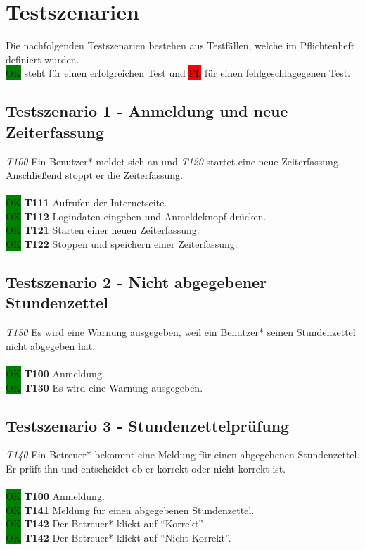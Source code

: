 \section{Testszenarien}
Die nachfolgenden Testszenarien bestehen aus Testfällen, welche im Pflichtenheft \linebreak definiert wurden. \\
\colorbox{green}{OK} steht für einen erfolgreichen Test und \colorbox{red}{FL} für einen fehlgeschlagegenen Test.


\subsection{Testszenario 1 - Anmeldung und neue Zeiterfassung}
\emph{T100} Ein Benutzer* meldet sich an und \emph{T120} startet eine neue Zeiterfassung. Anschließend stoppt er die Zeiterfassung.
\\\\
\colorbox{green}{OK} \textbf{T111} Aufrufen der Internetseite. \\
\colorbox{green}{OK} \textbf{T112} Logindaten eingeben und Anmeldeknopf drücken. \\
\colorbox{green}{OK} \textbf{T121} Starten einer neuen Zeiterfassung. \\
\colorbox{green}{OK} \textbf{T122} Stoppen und speichern einer Zeiterfassung.

\subsection{Testszenario 2 - Nicht abgegebener Stundenzettel}
\emph{T130} Es wird eine Warnung ausgegeben, weil ein Benutzer* seinen Stundenzettel nicht abgegeben hat.
\\\\
\colorbox{green}{OK} \textbf{T100} Anmeldung. \\
\colorbox{green}{OK} \textbf{T130} Es wird eine Warnung ausgegeben.

\subsection{Testszenario 3 - Stundenzettelprüfung}
\emph{T140} Ein Betreuer* bekommt eine Meldung für einen abgegebenen Stundenzettel. Er prüft ihn und entscheidet ob er korrekt oder nicht korrekt ist.
\\\\
\colorbox{green}{OK} \textbf{T100} Anmeldung. \\
\colorbox{green}{OK} \textbf{T141} Meldung für einen abgegebenen Stundenzettel. \\
\colorbox{green}{OK} \textbf{T142} Der Betreuer* klickt auf "`Korrekt"'. \\
\colorbox{green}{OK} \textbf{T142} Der Betreuer* klickt auf "`Nicht Korrekt"'.

